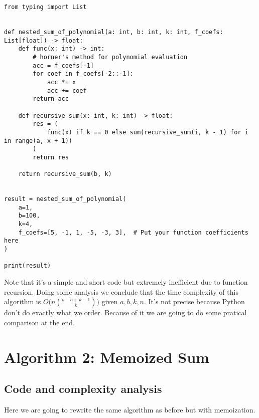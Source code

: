 \documentclass[12pt]{article}
\begin{document}
\begin{lstlisting}[style=Python]
from typing import List


def nested_sum_of_polynomial(a: int, b: int, k: int, f_coefs: List[float]) -> float:
    def func(x: int) -> int:
        # horner's method for polynomial evaluation
        acc = f_coefs[-1]
        for coef in f_coefs[-2::-1]:
            acc *= x
            acc += coef
        return acc

    def recursive_sum(x: int, k: int) -> float:
        res = (
            func(x) if k == 0 else sum(recursive_sum(i, k - 1) for i in range(a, x + 1))
        )
        return res

    return recursive_sum(b, k)


result = nested_sum_of_polynomial(
    a=1,
    b=100,
    k=4,
    f_coefs=[5, -1, 1, -5, -3, 3],  # Put your function coefficients here
)

print(result)    

\end{lstlisting}

Note that it's a simple and short code but extremely inefficient due to function recursion. Doing some analysis we conclude that the time complexity of this algorithm is $O\Big(n \binom{b-a+k-1}{k}\Big)$ given $a, b, k, n$. It's not precise because Python don't do exactly what we order. Because of it we are going to do some pratical comparison at the end.

\section{Algorithm 2: Memoized Sum}

\subsection{Code and complexity analysis}

Here we are going to rewrite the same algorithm as before but with memoization.
\end{document}

